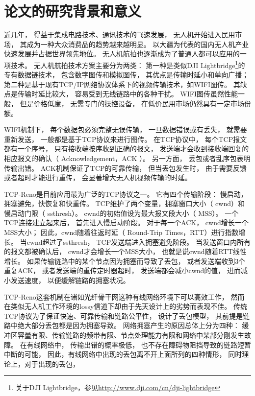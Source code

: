 \section{论文的研究背景和意义}
\par
近几年，
得益于集成电路技术、通讯技术的飞速发展，
无人机开始进入民用市场，
其成为一种大众消费品的趋势越来越明显。
以大疆为代表的国内无人机产业快速发展并占据世界领先地位。
无人机航拍也逐渐成为了普通人都可以应用的一项技术。
无人机航拍技术方案主要分为两类：
第一种是类似DJI Lightbridge\footnote{关于DJI Lightbridge，参见\url{http://www.dji.com/cn/dji-lightbridge}}的专有数据链技术，
包含数字图传和模拟图传，
其优点是传输时延小和单向广播；
第二种是基于现有TCP/IP网络协议体系下的视频传输技术，如WIFI图传。
其缺点是传输时延比较大，
容易受到无线链路中的各种干扰。
WIFI图传虽然性能一般，
但是价格低廉，
无需专门的操控设备，
在低价民用市场仍然具有一定市场份额。
\par
WIFI机制下，
每个数据包必须完整无误传输，
一旦数据错误或有丢失，
就需要重新发送，
一般都是基于TCP协议来进行图传。
在TCP协议中，
每个TCP报文都有一个序号，
只有接收端按序收到正确的报文，
发送端才会收到接收端回复的相应报文的确认（ Acknowledgement，ACK ）。
另一方面，
丢包或者乱序包表明传输出错。
ACK机制保证了TCP的可靠传输，
但当丢包发生时，
由于需要反馈或者超时才能进行重传，
会显著增大无人机视频传输的时延。
\par
TCP-Reno是目前应用最为广泛的TCP协议之一。
它有四个传输阶段：
慢启动，拥塞避免，快恢复和快重传。
TCP维护了两个变量，拥塞窗口大小（ cwnd）和慢启动门限（ ssthresh）。 
cwnd的初始值设为最大报文段大小（ MSS）。
一个TCP连接建立起来后，
首先进入慢启动阶段。
对于每一个ACK，
cwnd增长一个MSS大小；
因此，cwnd随着往返时延（ Round-Trip Times，RTT）进行指数增长。
当cwnd超过了ssthresh，
TCP发送端进入拥塞避免阶段。
当发送窗口内所有的报文都被确认后，
cwnd才会增长一个MSS大小，
也就是说cwnd随着RTT线性增长。
如果传输链路中的某个节点因为拥塞而导致了丢包，
或者发送端收到3个重复ACK，
或者发送端的重传定时器超时，
发送端都会减小cwnd的值，
进而减小发送速度，
以便缓解链路的拥塞状况。
\par
TCP-Reno这套机制在诸如光纤骨干网这种有线网络环境下可以高效工作，
然而在类似无人机工作环境的lossy信道下却由于先天设计上的劣势而表现不佳。
传统TCP协议为了保证快速、可靠传输和链路公平性，
设计了丢包模型，
其前提是链路中绝大部分丢包都是因为拥塞导致。
网络拥塞产生的原因总体上分为四种：
缓冲区容量有限、传输链路的频带有限、节点处理能力有限和网络中某部分刚发生故障。
在有线网络中，
传输出错的概率极低，
也不存在障碍物阻挡导致的链路短暂中断的可能，
因此，有线网络中出现的丢包离不开上面所列的四种情形，
同时理论上，对于出现的丢包，
